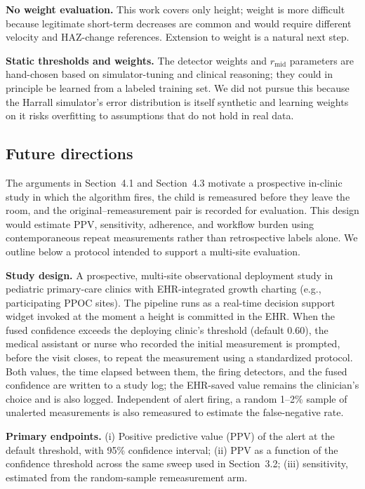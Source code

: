 \documentclass[11pt]{article}
\begin{document}
\textbf{No weight evaluation.} This work covers only height; weight is more difficult because legitimate short-term decreases are common and would require different velocity and HAZ-change references. Extension to weight is a natural next step.

\textbf{Static thresholds and weights.} The detector weights and \(r_{\mathrm{mid}}\) parameters are hand-chosen based on simulator-tuning and clinical reasoning; they could in principle be learned from a labeled training set. We did not pursue this because the Harrall simulator's error distribution is itself synthetic and learning weights on it risks overfitting to assumptions that do not hold in real data.

\subsection{Future directions}\label{future-directions}

The arguments in Section~4.1 and Section~4.3 motivate a prospective in-clinic study in which the algorithm fires, the child is remeasured before they leave the room, and the original--remeasurement pair is recorded for evaluation. This design would estimate PPV, sensitivity, adherence, and workflow burden using contemporaneous repeat measurements rather than retrospective labels alone. We outline below a protocol intended to support a multi-site evaluation.

\textbf{Study design.} A prospective, multi-site observational deployment study in pediatric primary-care clinics with EHR-integrated growth charting (e.g., participating PPOC sites). The pipeline runs as a real-time decision support widget invoked at the moment a height is committed in the EHR. When the fused confidence exceeds the deploying clinic's threshold (default 0.60), the medical assistant or nurse who recorded the initial measurement is prompted, before the visit closes, to repeat the measurement using a standardized protocol. Both values, the time elapsed between them, the firing detectors, and the fused confidence are written to a study log; the EHR-saved value remains the clinician's choice and is also logged. Independent of alert firing, a random 1--2\% sample of unalerted measurements is also remeasured to estimate the false-negative rate.

\textbf{Primary endpoints.} (i) Positive predictive value (PPV) of the alert at the default threshold, with 95\% confidence interval; (ii) PPV as a function of the confidence threshold across the same sweep used in Section~3.2; (iii) sensitivity, estimated from the random-sample remeasurement arm.
\end{document}
